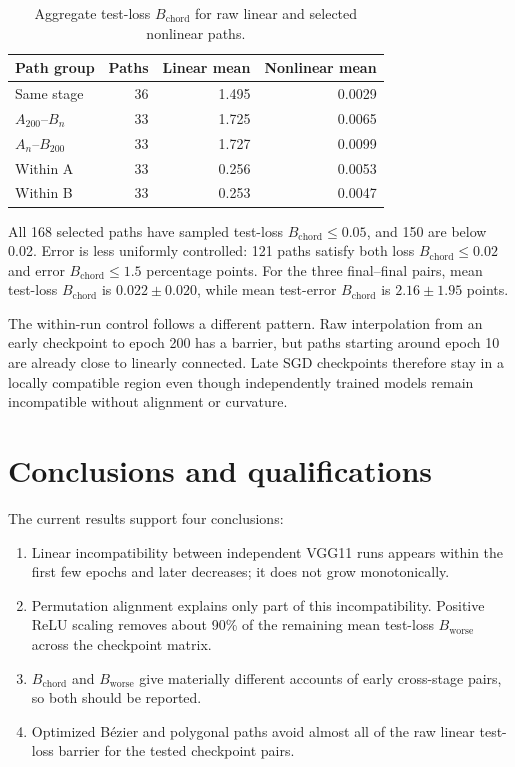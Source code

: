 \documentclass[11pt]{article}
\newcommand{\Bchord}{B_{\mathrm{chord}}}
\newcommand{\Bworse}{B_{\mathrm{worse}}}
\begin{document}
\begin{table}[H]
\centering
\small
\caption{Aggregate test-loss $\Bchord$ for raw linear and selected nonlinear
paths.}
\label{tab:nonlinear}
\begin{tabular}{lrrr}
\toprule
Path group & Paths & Linear mean & Nonlinear mean \\
\midrule
Same stage & 36 & 1.495 & 0.0029 \\
$A_{200}$--$B_n$ & 33 & 1.725 & 0.0065 \\
$A_n$--$B_{200}$ & 33 & 1.727 & 0.0099 \\
Within A & 33 & 0.256 & 0.0053 \\
Within B & 33 & 0.253 & 0.0047 \\
\bottomrule
\end{tabular}
\end{table}

All 168 selected paths have sampled test-loss $\Bchord\leq0.05$, and 150 are
below 0.02.  Error is less uniformly controlled: 121 paths satisfy both loss
$\Bchord\leq0.02$ and error $\Bchord\leq1.5$ percentage points.  For the three
final--final pairs, mean test-loss $\Bchord$ is $0.022\pm0.020$, while mean
test-error $\Bchord$ is $2.16\pm1.95$ points.

The within-run control follows a different pattern.  Raw interpolation from an
early checkpoint to epoch 200 has a barrier, but paths starting around epoch 10
are already close to linearly connected.  Late SGD checkpoints therefore stay
in a locally compatible region even though independently trained models remain
incompatible without alignment or curvature.

\section{Conclusions and qualifications}

The current results support four conclusions:

\begin{enumerate}
    \item Linear incompatibility between independent VGG11 runs appears within
    the first few epochs and later decreases; it does not grow monotonically.
    \item Permutation alignment explains only part of this incompatibility.
    Positive ReLU scaling removes about 90\% of the remaining mean test-loss
    $\Bworse$ across the checkpoint matrix.
    \item $\Bchord$ and $\Bworse$ give materially different accounts of early
    cross-stage pairs, so both should be reported.
    \item Optimized B\'ezier and polygonal paths avoid almost all of the raw
    linear test-loss barrier for the tested checkpoint pairs.
\end{enumerate}
\end{document}
